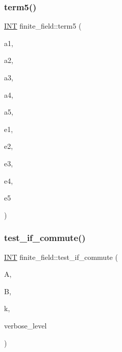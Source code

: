 \subsubsection{\texorpdfstring{term5()}{term5()}}
{\footnotesize\ttfamily \mbox{\hyperlink{galois_8h_a09fddde158a3a20bd2dcadb609de11dc}{I\+NT}} finite\+\_\+field\+::term5 (\begin{DoxyParamCaption}\item[{\mbox{\hyperlink{galois_8h_a09fddde158a3a20bd2dcadb609de11dc}{I\+NT}}}]{a1,  }\item[{\mbox{\hyperlink{galois_8h_a09fddde158a3a20bd2dcadb609de11dc}{I\+NT}}}]{a2,  }\item[{\mbox{\hyperlink{galois_8h_a09fddde158a3a20bd2dcadb609de11dc}{I\+NT}}}]{a3,  }\item[{\mbox{\hyperlink{galois_8h_a09fddde158a3a20bd2dcadb609de11dc}{I\+NT}}}]{a4,  }\item[{\mbox{\hyperlink{galois_8h_a09fddde158a3a20bd2dcadb609de11dc}{I\+NT}}}]{a5,  }\item[{\mbox{\hyperlink{galois_8h_a09fddde158a3a20bd2dcadb609de11dc}{I\+NT}}}]{e1,  }\item[{\mbox{\hyperlink{galois_8h_a09fddde158a3a20bd2dcadb609de11dc}{I\+NT}}}]{e2,  }\item[{\mbox{\hyperlink{galois_8h_a09fddde158a3a20bd2dcadb609de11dc}{I\+NT}}}]{e3,  }\item[{\mbox{\hyperlink{galois_8h_a09fddde158a3a20bd2dcadb609de11dc}{I\+NT}}}]{e4,  }\item[{\mbox{\hyperlink{galois_8h_a09fddde158a3a20bd2dcadb609de11dc}{I\+NT}}}]{e5 }\end{DoxyParamCaption})}

\mbox{\label{classfinite__field_a326f80dfab77a34f4843ea6a68fc36b4}} 
\subsubsection{\texorpdfstring{test\+\_\+if\+\_\+commute()}{test\_if\_commute()}}
{\footnotesize\ttfamily \mbox{\hyperlink{galois_8h_a09fddde158a3a20bd2dcadb609de11dc}{I\+NT}} finite\+\_\+field\+::test\+\_\+if\+\_\+commute (\begin{DoxyParamCaption}\item[{\mbox{\hyperlink{galois_8h_a09fddde158a3a20bd2dcadb609de11dc}{I\+NT}} $\ast$}]{A,  }\item[{\mbox{\hyperlink{galois_8h_a09fddde158a3a20bd2dcadb609de11dc}{I\+NT}} $\ast$}]{B,  }\item[{\mbox{\hyperlink{galois_8h_a09fddde158a3a20bd2dcadb609de11dc}{I\+NT}}}]{k,  }\item[{\mbox{\hyperlink{galois_8h_a09fddde158a3a20bd2dcadb609de11dc}{I\+NT}}}]{verbose\+\_\+level }\end{DoxyParamCaption})}

